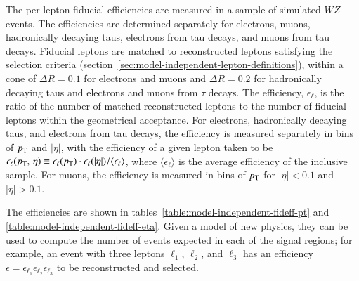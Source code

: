 The per-lepton fiducial efficiencies are measured in a sample of simulated $WZ$ events. The efficiencies are determined separately for electrons, muons, hadronically decaying taus, electrons from tau decays, and muons from tau decays. Fiducial leptons are matched to reconstructed leptons satisfying the selection criteria (section~\ref{sec:model-independent-lepton-definitions}), within a cone of $\Delta R=0.1$ for electrons and muons and $\Delta R=0.2$ for hadronically decaying taus and electrons and muons from $\tau$ decays. The efficiency, $\epsilon_{\ell}$, is the ratio of the number of matched reconstructed leptons to the number of fiducial leptons within the geometrical acceptance. For electrons, hadronically decaying taus, and electrons from tau decays, the efficiency is measured separately in bins of $p_{\text{T}}$ and $|\eta|$, with the efficiency of a given lepton taken to be $\epsilon_{\ell}(\pt,\,\eta) \equiv \epsilon_{\ell}(\pt)\cdot\epsilon_{\ell}(|\eta|) / \langle \epsilon_{\ell} \rangle$, where $\langle \epsilon_{\ell} \rangle$ is the average efficiency of the inclusive sample. For muons, the efficiency is measured in bins of $p_{\text{T}}$ for $|\eta|<0.1$ and $|\eta|>0.1$. 

The efficiencies are shown in tables~\ref{table:model-independent-fideff-pt} and \ref{table:model-independent-fideff-eta}. Given a model of new physics, they can be used to compute the number of events expected in each of the signal regions; for example, an event with three leptons $\ell_1$, $\ell_2$, and $\ell_3$ has an efficiency $\epsilon=\epsilon_{\ell_1}\epsilon_{\ell_2}\epsilon_{\ell_3}$ to be reconstructed and selected. 

